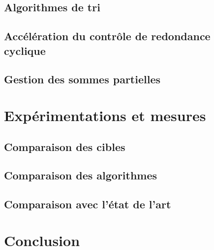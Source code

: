 \subsection{Algorithmes de tri}
\subsection{Accélération du contrôle de redondance cyclique}
\subsection{Gestion des sommes partielles}

\section{Expérimentations et mesures}

\subsection{Comparaison des cibles}
\subsection{Comparaison des algorithmes}
\subsection{Comparaison avec l'état de l'art}
 
\section*{Conclusion}
